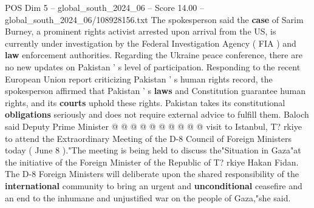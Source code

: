 \begin{textsample}{POS Dim 5 – global\_south\_2024\_06 – Score 14.00 – global\_south\_2024\_06/108928156.txt}
The spokesperson said the \textbf{case} of Sarim Burney, a prominent rights activist arrested upon arrival from the US, is currently under investigation by the Federal Investigation Agency ( FIA ) and \textbf{law} enforcement authorities.
Regarding the Ukraine peace conference, there are no new updates on Pakistan ' s level of participation.
Responding to the recent European Union report criticizing Pakistan ' s human rights record, the spokesperson affirmed that Pakistan ' s \textbf{laws} and Constitution guarantee human rights, and its \textbf{courts} uphold these rights.
Pakistan takes its constitutional \textbf{obligations} seriously and does not require external advice to fulfill them.
Baloch said Deputy Prime Minister @ @ @ @ @ @ @ @ @ @ visit to Istanbul, T? rkiye to attend the Extraordinary Meeting of the D-8 Council of Foreign Ministers today ( June 8 )."The meeting is being held to discuss the"Situation in Gaza"at the initiative of the Foreign Minister of the Republic of T? rkiye Hakan Fidan.
The D-8 Foreign Ministers will deliberate upon the shared responsibility of the \textbf{international} community to bring an urgent and \textbf{unconditional} ceasefire and an end to the inhumane and unjustified war on the people of Gaza,"she said.

\end{textsample}
